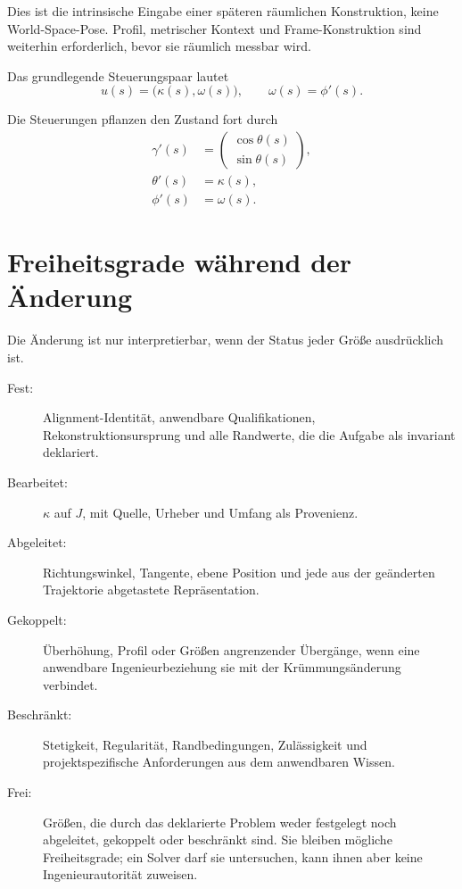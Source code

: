 Dies ist die intrinsische Eingabe einer späteren räumlichen Konstruktion,
keine World-Space-Pose. Profil, metrischer Kontext und Frame-Konstruktion sind
weiterhin erforderlich, bevor sie räumlich messbar wird.

\begin{definition}
\label{def:control-quantities}
Das grundlegende Steuerungspaar lautet
\begin{equation}
u(s)=\bigl(\kappa(s),\omega(s)\bigr),
\qquad \omega(s)=\phi'(s).
\label{eq:pose3-controls}
\end{equation}
\end{definition}

Die Steuerungen pflanzen den Zustand fort durch
\begin{equation}
\begin{aligned}
\gamma'(s)&=
\begin{pmatrix}\cos\theta(s)\\\sin\theta(s)\end{pmatrix},\\
\theta'(s)&=\kappa(s),\\
\phi'(s)&=\omega(s).
\end{aligned}
\label{eq:pose3-evolution}
\end{equation}

\section{Freiheitsgrade während der Änderung}

Die Änderung ist nur interpretierbar, wenn der Status jeder Größe
ausdrücklich ist.

\begin{description}
\item[Fest:] Alignment-Identität, anwendbare Qualifikationen,
  Rekonstruktionsursprung und alle Randwerte, die die Aufgabe als invariant
  deklariert.
\item[Bearbeitet:] \(\kappa\) auf \(J\), mit Quelle, Urheber und Umfang als
  Provenienz.
\item[Abgeleitet:] Richtungswinkel, Tangente, ebene Position und jede aus der
  geänderten Trajektorie abgetastete Repräsentation.
\item[Gekoppelt:] Überhöhung, Profil oder Größen angrenzender Übergänge, wenn
  eine anwendbare Ingenieurbeziehung sie mit der Krümmungsänderung verbindet.
\item[Beschränkt:] Stetigkeit, Regularität, Randbedingungen, Zulässigkeit und
  projektspezifische Anforderungen aus dem anwendbaren Wissen.
\item[Frei:] Größen, die durch das deklarierte Problem weder festgelegt noch
  abgeleitet, gekoppelt oder beschränkt sind. Sie bleiben mögliche
  Freiheitsgrade; ein Solver darf sie untersuchen, kann ihnen aber keine
  Ingenieurautorität zuweisen.
\end{description}


